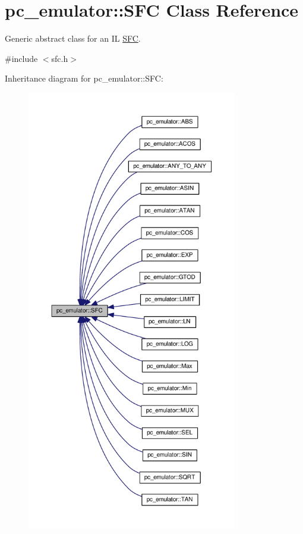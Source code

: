 \hypertarget{classpc__emulator_1_1SFC}{}\section{pc\+\_\+emulator\+:\+:S\+FC Class Reference}
\label{classpc__emulator_1_1SFC}


Generic abstract class for an IL \hyperlink{classpc__emulator_1_1SFC}{S\+FC}.  




{\ttfamily \#include $<$sfc.\+h$>$}



Inheritance diagram for pc\+\_\+emulator\+:\+:S\+FC\+:\nopagebreak
\begin{figure}[H]
\begin{center}
\leavevmode
\includegraphics[height=550pt]{classpc__emulator_1_1SFC__inherit__graph}
\end{center}
\end{figure}


